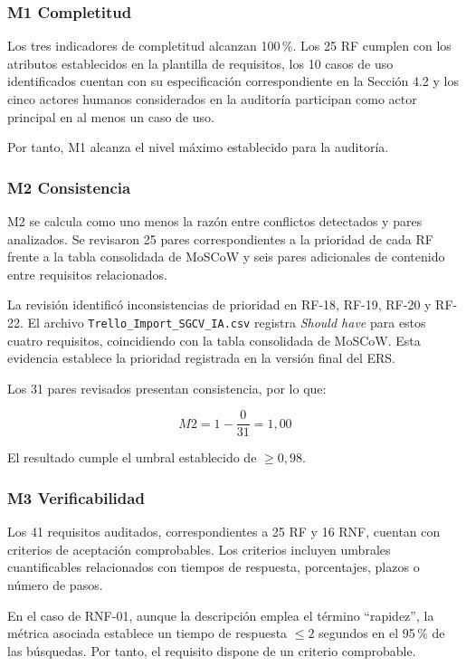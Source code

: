 \subsubsection*{M1 Completitud}

Los tres indicadores de completitud alcanzan 100\,\%. Los 25 RF cumplen con
los atributos establecidos en la plantilla de requisitos, los 10 casos de uso
identificados cuentan con su especificación correspondiente en la Sección 4.2
y los cinco actores humanos considerados en la auditoría participan como actor
principal en al menos un caso de uso.

Por tanto, M1 alcanza el nivel máximo establecido para la auditoría.

\subsubsection*{M2 Consistencia}

M2 se calcula como uno menos la razón entre conflictos detectados y pares
analizados. Se revisaron 25 pares correspondientes a la prioridad de cada RF
frente a la tabla consolidada de MoSCoW y seis pares adicionales de contenido
entre requisitos relacionados.

La revisión identificó inconsistencias de prioridad en RF-18, RF-19, RF-20 y
RF-22. El archivo \texttt{Trello\_Import\_SGCV\_IA.csv} registra
\emph{Should have} para estos cuatro requisitos, coincidiendo con la tabla
consolidada de MoSCoW. Esta evidencia establece la prioridad registrada en la
versión final del ERS.

Los 31 pares revisados presentan consistencia, por lo que:

\[
M2 = 1-\frac{0}{31}=1{,}00
\]

El resultado cumple el umbral establecido de $\geq 0{,}98$.

\subsubsection*{M3 Verificabilidad}

Los 41 requisitos auditados, correspondientes a 25 RF y 16 RNF, cuentan con
criterios de aceptación comprobables. Los criterios incluyen umbrales
cuantificables relacionados con tiempos de respuesta, porcentajes, plazos o
número de pasos.

En el caso de RNF-01, aunque la descripción emplea el término ``rapidez'', la
métrica asociada establece un tiempo de respuesta $\leq 2$ segundos en el
95\,\% de las búsquedas. Por tanto, el requisito dispone de un criterio
comprobable.

